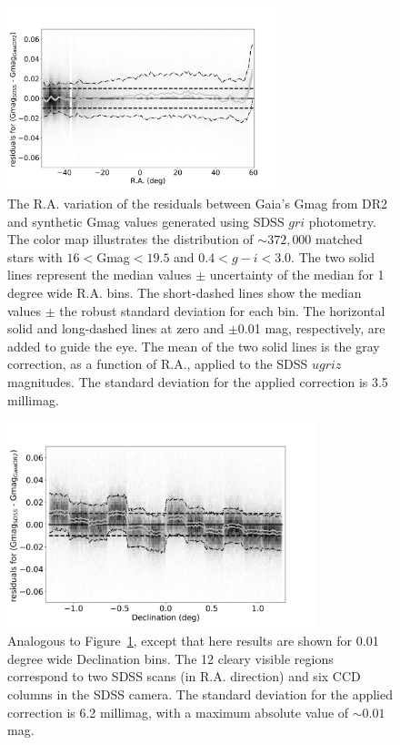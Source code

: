 \begin{figure}[th!]
  \centering\includegraphics[width=8cm]{figures/GmagCorrection_RA_Hess.png} 
\caption{The R.A. variation of the residuals between Gaia's Gmag from DR2
and synthetic Gmag values generated using SDSS $gri$ photometry. The 
color map illustrates the distribution of $\sim 372,000$ matched stars with 
$16<$Gmag$<19.5$ and $0.4 < g-i < 3.0$. The two solid lines represent the 
median values $\pm$ uncertainty of the median for 1 degree wide R.A. bins. 
The short-dashed lines show the median values $\pm$ the robust standard 
deviation for each bin. The horizontal solid and long-dashed lines at zero and 
$\pm$0.01 mag, respectively, are added to guide the eye. The mean of the two 
solid lines is the gray correction, as a function of R.A., applied to the SDSS 
$ugriz$ magnitudes. The standard deviation for the applied correction is 3.5 millimag.}
\label{fig:graycorrRA}
\end{figure}

\begin{figure}[th!]
    \centering\includegraphics[width=9cm]{figures/GmagCorrection_Dec_Hess.png} 
\caption{Analogous to Figure~\ref{fig:graycorrRA}, except that here results are shown for
0.01 degree wide Declination bins. The 12 cleary visible regions correspond to
two SDSS scans (in R.A. direction) and six CCD columns in the SDSS camera. 
The standard deviation for the applied correction is 6.2 millimag, with a maximum
absolute value of $\sim0.01$ mag.}
\label{fig:graycorrDec}
\end{figure}


